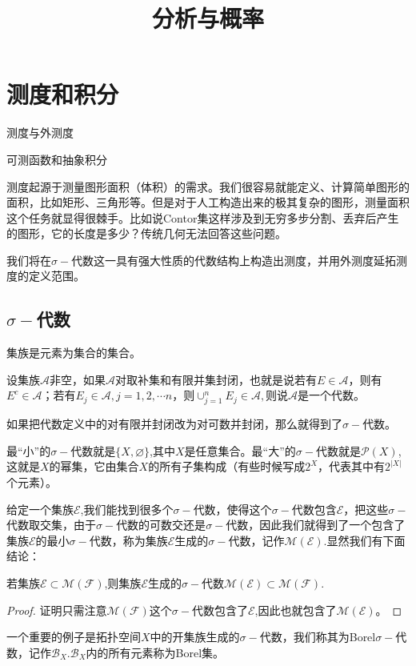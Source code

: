 \documentclass[lang=cn,10pt]{elegantbook}
\title{分析与概率}
\begin{document}
	
	
	\maketitle
	\frontmatter
	
	\tableofcontents
	
	\mainmatter
	\chapter{测度和积分}
	\begin{introduction}
		\item 测度与外测度
		\item 可测函数和抽象积分
	\end{introduction}
	测度起源于测量图形面积（体积）的需求。我们很容易就能定义、计算简单图形的面积，比如矩形、三角形等。但是对于人工构造出来的极其复杂的图形，测量面积这个任务就显得很棘手。比如说Contor集这样涉及到无穷多步分割、丢弃后产生的图形，它的长度是多少？传统几何无法回答这些问题。

	我们将在\(\sigma-\)代数这一具有强大性质的代数结构上构造出测度，并用外测度延拓测度的定义范围。
	\section{\(\sigma-\)代数}
	集族是元素为集合的集合。
	\begin{definition}
		设集族\(\mathcal{A}\)非空，如果\(\mathcal{A}\)对取补集和有限并集封闭，也就是说若有\(E\in \mathcal{A}\)，则有\(E^c\in \mathcal{A}\)；若有\(E_j\in \mathcal{A},j=1,2,\cdots n\)，则\(\cup_{j=1}^nE_j\in \mathcal{A},\)则说\(\mathcal{A}\)是一个代数。

		如果把代数定义中的对有限并封闭改为对可数并封闭，那么就得到了\(\sigma-\)代数。
	\end{definition}
	最“小”的\(\sigma-\)代数就是\(\{X,\varnothing\}\),其中\(X\)是任意集合。最“大”的\(\sigma-\)代数就是\(\mathcal{P}(X)\),这就是\(X\)的幂集，它由集合\(X\)的所有子集构成（有些时候写成\(2^X\)，代表其中有\(2^{|X|}\)个元素）。

	给定一个集族\(\mathcal{E}\),我们能找到很多个\(\sigma-\)代数，使得这个\(\sigma-\)代数包含\(\mathcal{E}\)，把这些\(\sigma-\)代数取交集，由于\(\sigma-\)代数的可数交还是\(\sigma-\)代数，因此我们就得到了一个包含了集族\(\mathcal{E}\)的最小\(\sigma-\)代数，称为集族\(\mathcal{E}\)生成的\(\sigma-\)代数，记作\(\mathcal{M}(\mathcal{E})\).显然我们有下面结论：
	\begin{proposition}
		若集族\(\mathcal{E}\subset \mathcal{M}(\mathcal{F})\),则集族\(\mathcal{E}\)生成的\(\sigma-\)代数\(\mathcal{M}(\mathcal{E})\subset \mathcal{M}(\mathcal{F}).\)
	\end{proposition}
	\begin{proof}
		证明只需注意\(\mathcal{M}(\mathcal{F})\)这个\(\sigma-\)代数包含了\(\mathcal{E}\),因此也就包含了\(\mathcal{M}(\mathcal{E})\)。
	\end{proof}
	一个重要的例子是拓扑空间\(X\)中的开集族生成的\(\sigma-\)代数，我们称其为Borel\(\sigma-\)代数，记作\(\mathcal{B}_X\).\(\mathcal{B}_X\)内的所有元素称为Borel集。
\end{document}
